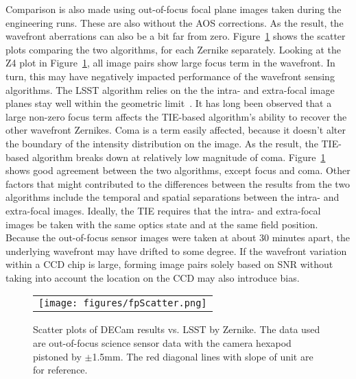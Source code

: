 \documentclass[]{spie}  %
\begin{document}
Comparison is also made using out-of-focus focal plane images taken during the engineering runs.
These are also without the AOS corrections. As the result, the wavefront aberrations can also be a bit far from zero. Figure~\ref{fig:fpScatter} shows the scatter plots comparing the two algorithms, for each Zernike separately. Looking at the Z4 plot in Figure~\ref{fig:fpScatter}, all image pairs show large focus term in the wavefront. In turn, this may have negatively impacted performance of the wavefront sensing algorithms.
The LSST algorithm relies on the the intra- and extra-focal image planes stay well within the geometric limit~\cite{lsstcwfs}.
It has long been observed that a large non-zero focus term affects the TIE-based algorithm's ability to recover the other wavefront Zernikes.
Coma is a term easily affected, because it doesn't alter the boundary of the intensity distribution on the image. As the result, the TIE-based algorithm breaks down at relatively low magnitude of coma.
Figure~\ref{fig:fpScatter} shows good agreement between the two algorithms, except focus and coma.
Other factors that might contributed to the differences between the results from the two algorithms include the temporal and spatial separations between the intra- and extra-focal images.
Ideally, the TIE requires that the intra- and extra-focal images be taken with the same optics state and at the same field position.
Because the out-of-focus sensor images were taken at about 30 minutes apart, the underlying wavefront may have drifted to some degree.
If the wavefront variation within a CCD chip is large, forming image pairs solely based on SNR without taking into account the location on the CCD may also introduce bias.

   \begin{figure} [tbph]
   \begin{center}
   \begin{tabular}{c} %
   \texttt{[image: figures/fpScatter.png]}
   \end{tabular}
   \end{center}
   \caption[example] 
   { \label{fig:fpScatter} 
Scatter plots of DECam results vs. LSST by Zernike. The data used are out-of-focus science sensor data with the camera hexapod pistoned by $\pm$1.5mm. The red diagonal lines with slope of unit are for reference.
}
   \end{figure} 
\end{document}
